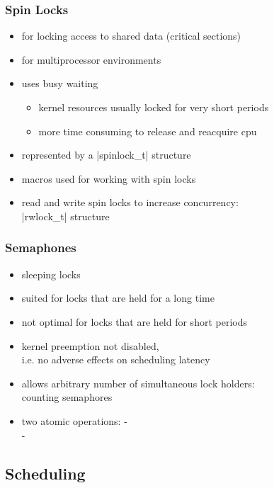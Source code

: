 \documentclass[dvipsnames]{beamer}
\begin{document}
\begin{frame}
  \frametitle{Spin Locks}

  \begin{itemize}
    \item for locking access to shared data (critical sections)
    \item for multiprocessor environments
    \item uses busy waiting
    \begin{itemize}
      \item kernel resources usually locked for very short periods
      \item more time consuming to release and reacquire cpu
    \end{itemize}

    \medskip
    \item represented by a |spinlock_t| structure
    \item macros used for working with spin locks
    \item read and write spin locks to increase concurrency:\\
      |rwlock_t| structure
  \end{itemize}
\end{frame}

\begin{frame}
  \frametitle{Semaphones}

  \begin{itemize}
    \item sleeping locks
    \item suited for locks that are held for a long time
    \item not optimal for locks that are held for short periods

    \medskip
    \item kernel preemption not disabled,\\
      i.e. no adverse effects on scheduling latency
    \item allows arbitrary number of simultaneous lock holders:\\
      counting semaphores

    \medskip
    \item two atomic operations:  - \\
       - 
  \end{itemize}
\end{frame}

\subsection{Scheduling}
\end{document}
